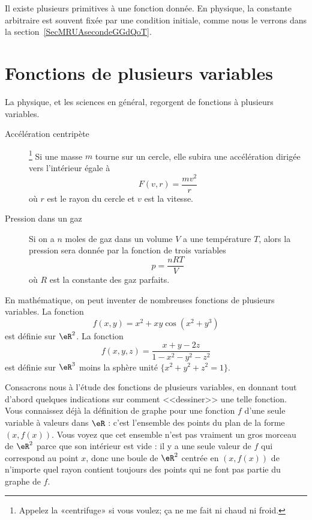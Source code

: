 \begin{normaltext}
	Il existe plusieurs primitives à une fonction donnée. En physique, la constante arbitraire est souvent fixée par une condition initiale, comme nous le verrons dans la section~\ref{SecMRUAsecondeGGdQoT}.
\end{normaltext}

\section{Fonctions de plusieurs variables}

La physique, et les sciences en général, regorgent de fonctions à plusieurs variables.
\begin{description}
	\item[Accélération centripète]\footnote{Appelez la «centrifuge» si vous voulez; ça ne me fait ni chaud ni froid.}  Si une masse \( m\) tourne sur un cercle, elle subira une accélération dirigée vers l'intérieur égale à
	\begin{equation}
		F(v,r)=\frac{ mv^2 }{ r }
	\end{equation}
	où \( r\) est le rayon du cercle et \( v\) est la vitesse.
	\item[Pression dans un gaz] Si on a \( n\) moles de gaz dans un volume \( V\) a une température \( T\), alors la pression sera donnée par la fonction de trois variables
		\begin{equation}
			p=\frac{ nRT }{ V }
		\end{equation}
		où \( R\) est la constante des gaz parfaits.
\end{description}

En mathématique, on peut inventer de nombreuses fonctions de plusieurs variables. La fonction
\begin{equation}
	f(x,y)=x^2+xy\cos(x^2+y^3)
\end{equation}
est définie sur \( \eR^2\). La fonction
\begin{equation}
	f(x,y,z)=\frac{ x+y-2z }{ 1-x^2-y^2-z^2 }
\end{equation}
est définie sur \( \eR^3\) moins la sphère unité \( \{ x^2+y^2+z^2=1 \}\).

Consacrons nous à l'étude des fonctions de plusieurs variables, en donnant tout d'abord quelques indications sur comment <<dessiner>> une telle fonction. Vous connaissez déjà la définition de graphe pour une fonction \( f\) d'une seule variable à valeurs dans \( \eR\) : c'est l'ensemble des points du plan de la forme \( (x, f(x))\). Vous voyez que cet ensemble n'est pas vraiment un gros morceau de \( \eR^2\) parce que son intérieur est vide : il y a une seule valeur de \( f\) qui correspond au point \( x\), donc une boule de \( \eR^2\) centrée en \( (x, f(x))\) de n'importe quel rayon contient toujours des points qui ne font pas partie du graphe de \( f\).

